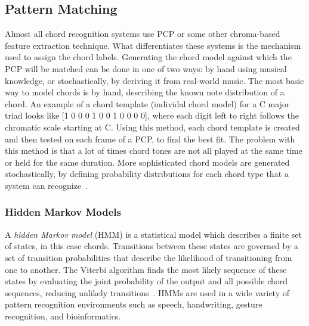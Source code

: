 \documentclass{sig-alternate}
\begin{document}
\subsection{Pattern Matching}

Almost all chord recognition systems use PCP or some other chroma-based feature extraction technique. What differentiates these systems is the mechanism used to assign the chord labels. Generating the chord model against which the PCP will be matched can be done in one of two ways: by hand using musical knowledge, or stochastically, by deriving it from real-world music. The most basic way to model chords is by hand, describing the known note distribution of a chord. An example of a chord template (individal chord model) for a C major triad looks like [1 0 0 0 1 0 0 1 0 0 0 0], where each digit left to right follows the chromatic scale starting at C. Using this method, each chord template is created and then tested on each frame of a PCP, to find the best fit. The problem with this method is that a lot of times chord tones are not all played at the same time or held for the same duration. More sophisticated chord models are generated stochastically, by defining probability distributions for each chord type that a system can recognize~\cite{TaeMin:2014}.  



\subsubsection{Hidden Markov Models}\label{main} 

A \textit{hidden Markov model} (HMM) is a statistical model which describes a finite set of states, in this case chords. Transitions between these states are governed by a set of transition probabilities that describe the likelihood of transitioning from one to another. The Viterbi algorithm finds the most likely sequence of these states by evaluating the joint probability of the output and all possible chord sequences, reducing unlikely transitions~\cite{TaeMin:2014}. HMMs are used in a wide variety of pattern recognition environments such as speech, handwriting, gesture recognition, and bioinformatics. 

\end{document}
